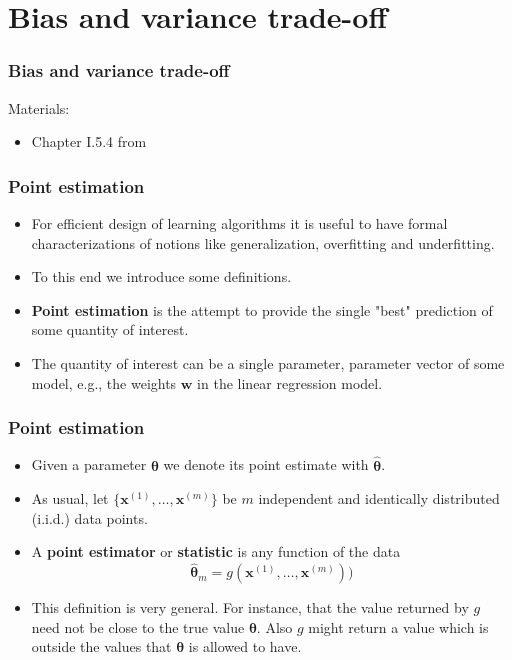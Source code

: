 \documentclass[notes]{beamer}          %
\newcommand{\vect}[1]{\bm{#1}}
\newif\iffull
\begin{document}
\section{Bias and variance trade-off}

\begin{frame}
\frametitle{Bias and variance trade-off}
Materials:
\begin{itemize}
    \item Chapter I.5.4 from \cite{deeplearning}
\end{itemize}
\end{frame}


\begin{frame}
\frametitle{Point estimation}
    \begin{itemize}
        \item For efficient design of learning algorithms it is useful to have formal characterizations of notions like generalization, overfitting and underfitting.
        \item To this end we introduce some definitions.
        \item {\bf Point estimation} is the attempt to provide the single "best" prediction of some quantity of interest.
        \item The quantity of interest can be a single parameter, parameter vector of some model, e.g., the weights $\vect{w}$ in the linear regression model.
        \iffull
        \item It can also be a whole function, e.g., the linear function or polynomial of some degree, like in the polynomial regression.
        \fi
    \end{itemize}
\end{frame}


\begin{frame}
\frametitle{Point estimation}
    \begin{itemize}
        \item Given a parameter $\vect{\theta}$ we denote its point estimate with ${\vect{\hat{\theta}}}$.
        \item As usual, let $\{\vect{x}^{(1)}, \ldots, \vect{x}^{(m)} \}$ be $m$ independent and identically distributed (i.i.d.) data points.
        \item A {\bf point estimator} or {\bf statistic} is any function of the data
        $$
        \hat{\vect{\theta}}_m = g(\vect{x}^{(1)}, \ldots, \vect{x}^{(m)}))
        $$
        \item This definition is very general. For instance, that the value returned by $g$ need not be close to the true value $\vect{\theta}$. Also $g$ might return a value which is outside the values that $\vect{\theta}$ is allowed to have.

    \end{itemize}
\end{frame}
\end{document}

